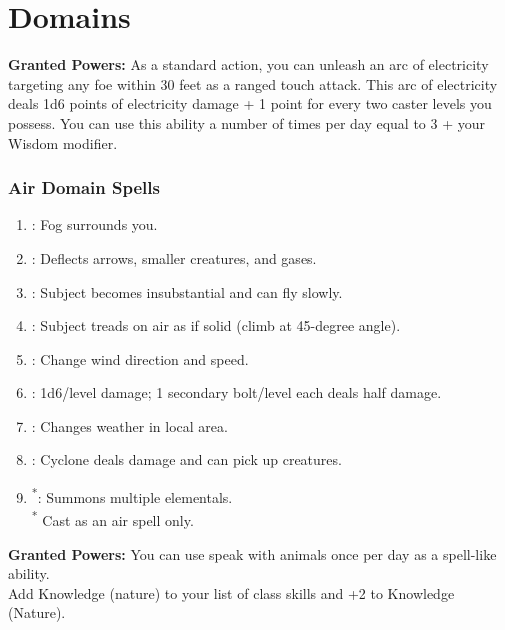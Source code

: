 \section{Domains}

\textbf{Granted Powers:} As a standard action, you can unleash an arc of electricity targeting any foe within 30 feet as a ranged touch attack. This arc of electricity deals 1d6 points of electricity damage + 1 point for every two caster levels you possess. You can use this ability a number of times per day equal to 3 + your Wisdom modifier.
\subsubsection{Air Domain Spells}
\begin{enumerate}
	\item{:} Fog surrounds you.
	\item{:} Deflects arrows, smaller creatures, and gases.
	\item{:} Subject becomes insubstantial and can fly slowly.
	\item{:} Subject treads on air as if solid (climb at 45-degree angle).
	\item{:} Change wind direction and speed.
	\item{:} 1d6/level damage; 1 secondary bolt/level each deals half damage.
	\item{:} Changes weather in local area.
	\item{:} Cyclone deals damage and can pick up creatures.
	\item{\textsuperscript{*}:} Summons multiple elementals.
	\\ \textsuperscript{*} Cast as an air spell only.
\end{enumerate}

\textbf{Granted Powers:} You can use speak with animals once per day as a spell-like ability.
\\Add Knowledge (nature) to your list of class skills and +2 to Knowledge (Nature).

